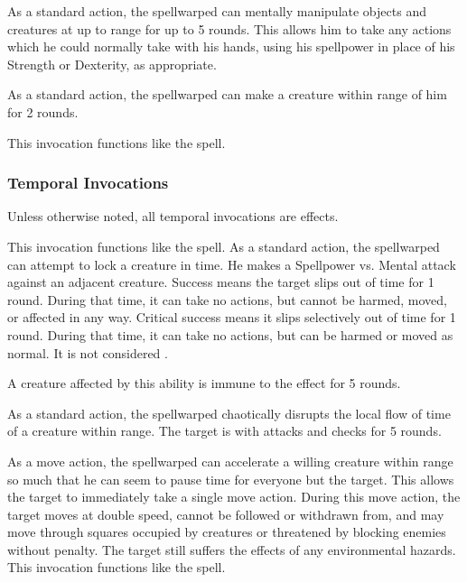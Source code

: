             As a standard action, the spellwarped can mentally manipulate objects and creatures at up to \rngclose range for up to 5 rounds.
            This allows him to take any actions which he could normally take with his hands, using his spellpower in place of his Strength or Dexterity, as appropriate.

            As a standard action, the spellwarped can make a creature within \rngmed range of him \immobilized for 2 rounds.

            This invocation functions like the  spell.

        \subsubsection{Temporal Invocations}
            Unless otherwise noted, all temporal invocations are  effects.

            This invocation functions like the  spell.
            As a standard action, the spellwarped can attempt to lock a creature in time.
            He makes a Spellpower vs. Mental attack against an adjacent creature.
            Success means the target slips out of time for 1 round.
            During that time, it can take no actions, but cannot be harmed, moved, or affected in any way.
            Critical success means it slips selectively out of time for 1 round.
            During that time, it can take no actions, but can be harmed or moved as normal.
            It is not considered \helpless.
            \par A creature affected by this ability is immune to the effect for 5 rounds.

            As a standard action, the spellwarped chaotically disrupts the local flow of time of a creature within \rngclose range.
            The target is \impaired with attacks and checks for 5 rounds.

            As a move action, the spellwarped can accelerate a willing creature within \rngclose range so much that he can seem to pause time for everyone but the target.
            This allows the target to immediately take a single move action.
            During this move action, the target moves at double speed, cannot be followed or withdrawn from, and may move through squares occupied by creatures or threatened by blocking enemies without penalty.
            The target still suffers the effects of any environmental hazards.
            This invocation functions like the  spell.

